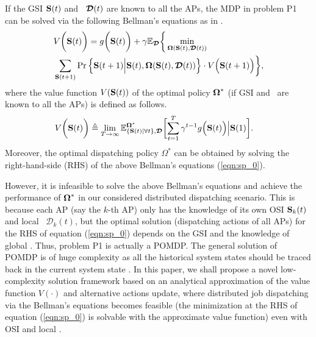 If the GSI $\mathbf{S}(t)$ and \brlatency~$\boldsymbol{\mathcal{D}}(t)$ are known to all the APs, the MDP in problem P1 can be solved via the following Bellman's equations as in \cite{sutton1998}.
\begin{align}
    &V\bigg(\mathbf{S}(t)\bigg) =g\bigg(\mathbf{S}(t)\bigg)
        + \gamma\mathbb{E}_{\boldsymbol{\mathcal{D}}}\bigg\{
            \min_{\boldsymbol{\Omega}(\mathbf{S}(t),\boldsymbol{\mathcal{D}}(t))}
            \nonumber\\
            &\sum_{\mathbf{S}(t+1)} \Pr \Big\{ 
                \mathbf{S}(t+1) \Big| \mathbf{S}(t), \boldsymbol{\Omega}(\mathbf{S}(t), \boldsymbol{\mathcal{D}}(t)) \Big\} \cdot V\Big(\mathbf{S}(t+1)\Big)
            \bigg\},
    \label{eqn:sp_0}
\end{align}
where the value function $V(\mathbf{S}(t))$ of the optimal policy $\boldsymbol{\Omega}^{*}$ (if GSI and \brlatency~are known to all the APs) is defined as follows.
\begin{align}
    &V\Paren{\Stat(t)} \define
    \lim_{T\to\infty} 
    \mathbb{E}^{\Policy^*}_{\set{\Stat(t)|\forall t}, \Delay} \Bracket{
        \sum_{t=1}^{T} \gamma^{t-1} g\Big( \Stat(t) \Big) \Big| \Stat(1)
    }.
    \label{eqn:val_f}
\end{align}
Moreover, the optimal dispatching policy $\Omega^{*}$ can be obtained by solving the right-hand-side (RHS) of the above Bellman's equations (\ref{eqn:sp_0}).

However, it is infeasible to solve the above Bellman's equations {and achieve the performance of $\boldsymbol{\Omega}^*$ in our considered distributed dispatching scenario.}
This is because each AP (say the $k$-th AP) only has the knowledge of its own OSI $\mathbf{S}_{k}(t)$ and local \brlatency~$\mathcal{D}_{k}(t)$, but the optimal solution (dispatching actions of all APs) for the RHS of equation (\ref{eqn:sp_0}) depends on the GSI and the knowledge of global \brlatency.
Thus, problem P1 is actually a POMDP.
The general solution of POMDP is of huge complexity {as all the historical system states should be traced back in the current system state} \cite{IJCAI03-NairR,IJCAI99-BoutilierC}.
In this paper, we shall propose a novel low-complexity solution framework based on an analytical approximation of the value function $V(\cdot)$ and alternative actions update, where distributed job dispatching via the Bellman's equations becomes feasible
(the minimization at the RHS of equation (\ref{eqn:sp_0}) is solvable with the approximate value function)
even with OSI and local \brlatency.
